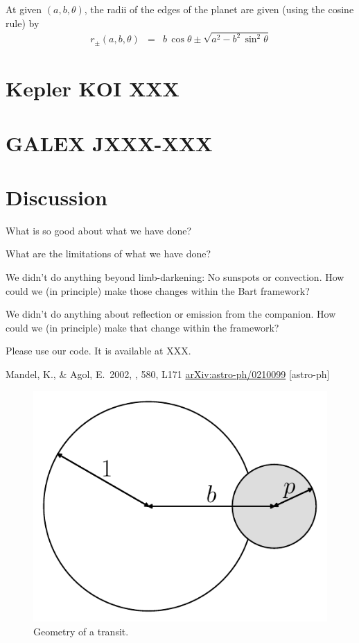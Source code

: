 \documentclass[12pt,preprint]{aastex}
\newcommand{\project}[1]{{\sffamily #1}}
\newcommand{\figlabel}[1]{\label{fig:#1}}
\begin{document}
At given $(a, b, \theta)$, the radii of the edges of the planet are given
(using the cosine rule) by
\begin{eqnarray}
    r_\pm (a, b, \theta) & = & b \, \cos \theta \pm \sqrt{a^2 -
        b^2\,\sin^2\theta}
\end{eqnarray}

\section{Kepler KOI XXX}

\section{GALEX JXXX-XXX}

\section{Discussion}

What is so good about what we have done?

What are the limitations of what we have done?

We didn't do anything beyond limb-darkening:  No sunspots or convection.
How could we (in principle) make those changes within the \project{Bart} framework?

We didn't do anything about reflection or emission from the companion.
How could we (in principle) make that change within the framework?

Please use our code.  It is available at XXX.

\acknowledgments

\newcommand{\arxiv}[1]{\href{http://arxiv.org/abs/#1}{arXiv:#1}}
\begin{thebibliography}{}\raggedright

        Mandel, K., \& Agol, E.\ 2002, \apjl, 580, L171
        \arxiv{astro-ph/0210099} [astro-ph]

\end{thebibliography}


\clearpage

\begin{figure}[htbp]
    \begin{center}
        \includegraphics[width=\textwidth]{figures/geom.pdf}
    \end{center}
    \caption{Geometry of a transit. \figlabel{geom}}
\end{figure}
\end{document}

